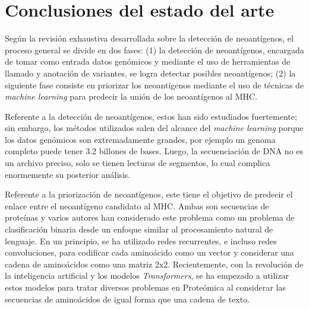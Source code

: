 \clearpage
\section{Conclusiones del estado del arte}

Según la revisión exhaustiva desarrollada sobre la detección de neoantígenos, el proceso general se divide en dos fases: (1) la detección de neoantígenos, encargada de tomar como entrada datos genómicos y mediante el uso de herramientas de llamado y anotación de variantes, se logra detectar posibles neoantígenos; (2) la siguiente fase consiste en priorizar los neoantígenos mediante el uso de técnicas de \textit{machine learning} para predecir la unión de los neoantígenos al MHC. 

Referente a la detección de neoantígenos, estos han sido estudiados fuertemente; sin embargo, los métodos utilizados salen del alcance del \textit{machine learning} porque los datos genómicos son extremadamente grandes, por ejemplo un genoma completo puede tener 3.2 billones de bases. Luego, la secuenciación de DNA no es un archivo preciso, solo se tienen lecturas de segmentos, lo cual complica enormemente su posterior análisis.

Referente a la priorización de neoantígenos, este tiene el objetivo de predecir el enlace entre el neoantígeno candidato al MHC. Ambas son secuencias de proteínas y varios autores han considerado este problema como un problema de clasificación binaria desde un enfoque similar al procesamiento natural de lenguaje. En un principio, se ha utilizado  redes recurrentes, e incluso redes convoluciones, para codificar cada aminoácido como un vector y considerar una cadena de aminoácidos como una matriz 2x2. Recientemente, con la revolución de la inteligencia artificial y los modelos \textit{Transformers}, se ha empezado a utilizar estos modelos para tratar diversos problemas en Proteómica al considerar las secuencias de aminoácidos de igual forma que una cadena de texto.